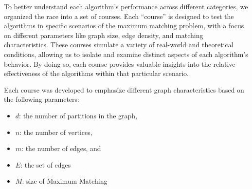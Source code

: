 To better understand each algorithm’s performance across different categories, we organized the race into a set of courses. Each “course” is designed to test the algorithms in specific scenarios of the maximum matching problem, with a focus on different parameters like graph size, edge density, and matching characteristics. These courses simulate a variety of real-world and theoretical conditions, allowing us to isolate and examine distinct aspects of each algorithm’s behavior. By doing so, each course provides valuable insights into the relative effectiveness of the algorithms within that particular scenario.

Each course was developed to emphasize different graph characteristics based on the following parameters:

\begin{itemize}
    \item $d$: the number of partitions in the graph,
    \item $n$: the number of vertices,
    \item $m$: the number of edges, and
    \item $E$: the set of edges
    \item $M$: size of Maximum Matching
\end{itemize}

